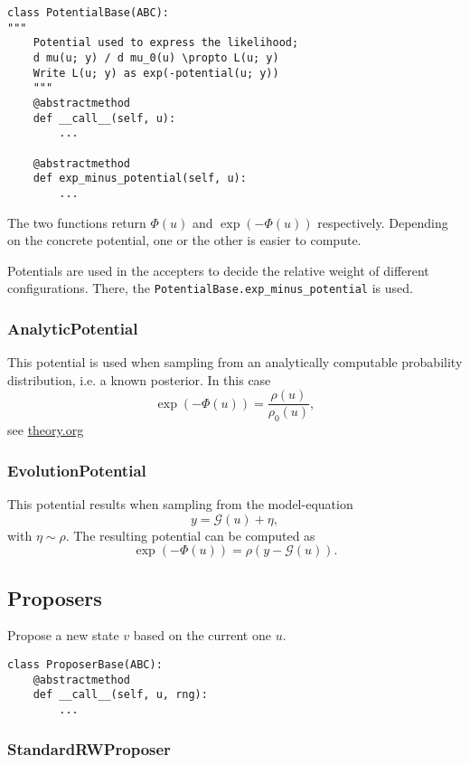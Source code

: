\documentclass[11pt]{article}
\newcommand{\G}[1]{{\mathcal{G} \left( #1 \right)}}
\begin{document}
\begin{verbatim}
class PotentialBase(ABC):
"""
    Potential used to express the likelihood;
    d mu(u; y) / d mu_0(u) \propto L(u; y)
    Write L(u; y) as exp(-potential(u; y))
    """
    @abstractmethod
    def __call__(self, u):
        ...

    @abstractmethod
    def exp_minus_potential(self, u):
        ...
\end{verbatim}

The two functions return \(\Phi(u)\) and \(\exp(-\Phi(u))\) respectively. Depending on the
concrete potential, one or the other is easier to compute.

Potentials are used in the accepters to decide the relative weight of different configurations.
There, the \texttt{PotentialBase.exp\_minus\_potential} is used.
\subsubsection{AnalyticPotential}
\label{sec:org185a9fe}

This potential is used when sampling from an analytically computable probability distribution,
i.e. a known posterior. In this case
$$\exp(-\Phi(u)) = \frac{\rho(u)}{\rho_0(u)},$$
see \url{theory.org}
\subsubsection{EvolutionPotential}
\label{sec:orgd64aeb3}

This potential results when sampling from the model-equation
$$y = \G{u} + \eta,$$
with \(\eta \sim \rho\). The resulting potential can be computed as
$$\exp(-\Phi(u)) = \rho(y - \G{u}).$$

\subsection{Proposers}
\label{sec:org57c9a7a}

Propose a new state \(v\) based on the current one \(u\).

\begin{verbatim}
class ProposerBase(ABC):
    @abstractmethod
    def __call__(self, u, rng):
        ...
\end{verbatim}

\subsubsection{StandardRWProposer}
\label{sec:org5b55ad1}
\end{document}
